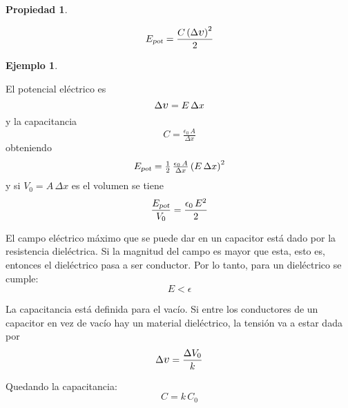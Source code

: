 \documentclass[a5paper,12pt,twoside]{book}
\newtheorem{prop}{{Propiedad}}[chapter]
\newtheorem{example}{{Ejemplo}}[chapter]
\begin{document}
\begin{mdframed}[style=MyFrame1]
    \begin{prop}
    \end{prop}
    \begin{equation*}
        \sub{E}{pot} = \frac{C \inParentheses{\Delta \voltage}^2}{2}
    \end{equation*}
\end{mdframed}

\begin{mdframed}[style=MyFrame2]
    \begin{example}
    \end{example}

    El potencial eléctrico es
    \begin{equation*}
        \Delta \voltage = E \, \Delta x
    \end{equation*}
    y la capacitancia
    \begin{equation*}
        C = \tfrac{\epsilon_0 \, A}{\Delta x}
    \end{equation*}
    obteniendo
    \begin{equation*}
        {{E}_\textsl{{pot}}} = \tfrac{1}{2} \, \tfrac{\epsilon_0 \, A}{\Delta x} \left(E \, \Delta x\right)^2
    \end{equation*}
    y si $V_0 = A \, \Delta x$ es el volumen se tiene
    \begin{equation*}
        \frac{{{E}_\textsl{{pot}}}}{V_0} = \frac{\epsilon_0 \, E^2}{2}
    \end{equation*}
\end{mdframed}

El campo eléctrico máximo que se puede dar en un capacitor está dado por la resistencia dieléctrica.
Si la magnitud del campo es mayor que esta, esto es, entonces el dieléctrico pasa a ser conductor.
Por lo tanto, para un dieléctrico se cumple:
\begin{equation*}
    E < \epsilon
\end{equation*}

La capacitancia está definida para el vacío.
Si entre los conductores de un capacitor en vez de vacío hay un material dieléctrico, la tensión va a estar dada por
\begin{equation*}
    \Delta \voltage = \frac{\Delta V_0}{k}
\end{equation*}

Quedando la capacitancia:
\begin{equation*}
    C = k \, C_0
\end{equation*}
\end{document}
